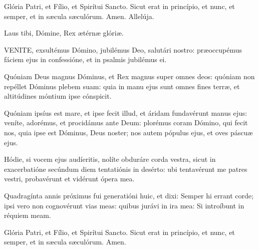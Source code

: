 Glória Patri, et Fílio, et Spirítui Sancto. Sicut erat in princípio, et nunc, et semper, et in sæcula sæculórum. Amen. Allelúja.


Laus tibi, Dómine, Rex ætérnæ glóriæ.



\lettrine[lines=2]{V}{ENITE}, exsultémus Dómino, jubilémus Deo, salutári nostro: præoccupémus fáciem ejus in confessióne, et in psalmis jubilémus ei.


Quóniam Deus magnus Dóminus, et Rex magnus super omnes deos: quóniam non repéllet Dóminus plebem suam: quia in manu ejus sunt omnes fines terræ, et altitúdines móntium ipse cónspicit.



Quóniam ipsíus est mare, et ipse fecit illud, et áridam fundavérunt manus ejus: veníte, adorémus, et procidámus ante Deum: plorémus coram Dómino, qui fecit nos, quia ipse est Dóminus, Deus noster; nos autem pópulus ejus, et oves páscuæ ejus.


Hódie, si vocem ejus audíeritis, nolíte obduráre corda vestra, sicut in exacerbatióne secúndum diem tentatiónis in desérto: ubi tentavérunt me patres vestri, probavérunt et vidérunt ópera mea.


Quadragínta annis próximus fui generatióni huic, et dixi: Semper hi errant corde; ipsi vero non cognovérunt vias meas: quibus jurávi in ira mea: Si introíbunt in réquiem meam.


Glória Patri, et Fílio, et Spirítui Sancto. Sicut erat in princípio, et nunc, et semper, et in sæcula sæculórum. Amen.


